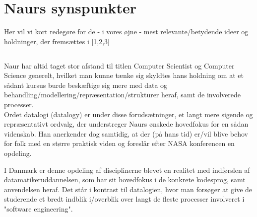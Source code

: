 \section{Naurs synspunkter}
Her vil vi kort redegøre for de - i vores øjne - mest relevante/betydende
ideer og holdninger, der fremsættes i [1,2,3]

\subsection{}
Naur har altid taget stor afstand til titlen Computer Scientist og Computer Science generelt,
hvilket man kunne tænke sig skyldtes hans holdning om at et sådant kursus burde beskæftige sig mere
med data og behandling/modellering/repræsentation/strukturer heraf, samt de involverede processer.\\
Ordet datalogi (datalogy) er under
disse forudsætninger, et langt mere sigende og repræsentativt ordvalg, der understreger
Naurs ønskede hovedfokus for en sådan videnskab. Han anerkender dog samtidig, at der (på hans tid) er/vil blive behov
for folk med en større praktisk viden og foreslår efter NASA konferencen en opdeling.

I Danmark er denne opdeling af disciplinerne blevet en realitet med indførslen af datamatikeruddannelsen,
som har sit hovedfokus i de konkrete kodesprog, samt anvendelsen heraf. Det står i kontrast til datalogien,
hvor man forsøger at give de studerende et bredt indblik i/overblik over langt de fleste processer involveret i
"software engineering".

